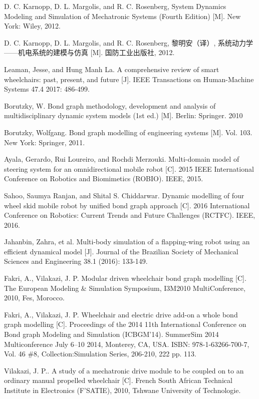 \newpage
{}
\begin{thebibliography}{0}
	
	D. C. Karnopp, D. L. Margolis, and R. C. Rosenberg, System Dynamics Modeling and Simulation of Mechatronic Systems (Fourth Edition) [M]. New York: Wiley, 2012.
		
	D. C. Karnopp, D. L. Margolis, and R. C. Rosenberg, 黎明安（译）, 系统动力学——机电系统的建模与仿真 [M]. 国防工业出版社, 2012.
	
	Leaman, Jesse, and Hung Manh La. A comprehensive review of smart wheelchairs: past, present, and future [J]. IEEE Transactions on Human-Machine Systems 47.4 2017: 486-499.
	
	Borutzky, W. Bond graph methodology, development and analysis of multidisciplinary dynamic system models (1st ed.) [M]. Berlin: Springer. 2010
	
	Borutzky, Wolfgang. Bond graph modelling of engineering systems  [M]. Vol. 103. New York: Springer, 2011.
	
	Ayala, Gerardo, Rui Loureiro, and Rochdi Merzouki. Multi-domain model of steering system for an omnidirectional mobile robot  [C]. 2015 IEEE International Conference on Robotics and Biomimetics (ROBIO). IEEE, 2015.
	
	Sahoo, Saumya Ranjan, and Shital S. Chiddarwar. Dynamic modelling of four wheel skid mobile robot by unified bond graph approach [C]. 2016 International Conference on Robotics: Current Trends and Future Challenges (RCTFC). IEEE, 2016.
	
	Jahanbin, Zahra, et al. Multi-body simulation of a flapping-wing robot using an efficient dynamical model [J]. Journal of the Brazilian Society of Mechanical Sciences and Engineering 38.1 (2016): 133-149.
	
	Fakri, A., Vilakazi, J. P. Modular driven wheelchair bond graph modelling [C]. The European Modeling \& Simulation Symposium, I3M2010 MultiConference, 2010, Fes, Morocco.
	
	Fakri, A., Vilakazi, J. P. Wheelchair and electric drive add-on a whole bond graph modelling [C]. Proceedings of the 2014 11th International Conference on Bond graph Modeling and Simulation (ICBGM’14). SummerSim 2014 Multiconference July 6–10 2014, Monterey, CA, USA. ISBN: 978-1-63266-700-7, Vol. 46 \#8, Collection:Simulation Series, 206-210, 222 pp. 113.
	
	Vilakazi, J. P.. A study of a mechatronic drive module to be coupled on to an ordinary manual propelled wheelchair [C]. French South African Technical Institute in Electronics (F’SATIE), 2010, Tshwane University of Technologie.
	
	
\end{thebibliography}
